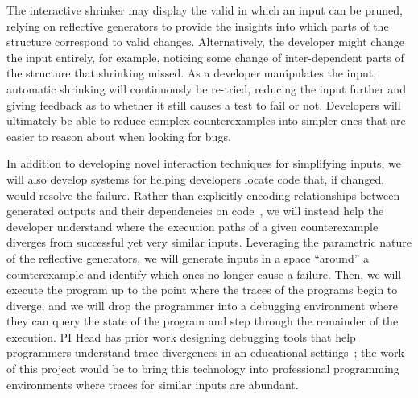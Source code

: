The interactive shrinker may display the valid in which an input can be pruned,
relying on reflective generators to provide the insights into which parts of the
structure correspond to valid changes. Alternatively, the developer might change
the input entirely, for example, noticing some change of inter-dependent parts
of the structure that shrinking missed.  As a developer manipulates the input,
automatic shrinking will continuously be re-tried, reducing the input further
and giving feedback as to whether it still causes a test to fail or not.
Developers will ultimately be able to reduce complex counterexamples into
simpler ones that are easier to reason about when looking for bugs.

In addition to developing novel interaction techniques for simplifying inputs,
we will also develop systems for helping developers locate code that, if
changed, would resolve the failure. Rather than explicitly encoding
relationships between generated outputs and their dependencies on
code~\cite{ref:ko2009finding}, we will instead help the developer
understand where the execution paths of a given counterexample diverges from
successful yet very similar inputs.
Leveraging the parametric nature of the
reflective generators, we will generate inputs in a space ``around'' a
counterexample and identify which ones no longer cause a failure.  Then, we will
execute the program up to the point where the traces of the programs begin to
diverge, and we will drop the programmer into a debugging environment where
they can query the state of the program and step through the remainder of the
execution. PI Head has prior work designing debugging tools that help
programmers understand trace divergences in an educational
settings~\cite{ref:suzuki2017tracediff}; the work of this project would be to
bring this technology into professional programming environments where traces
for similar inputs are abundant.


